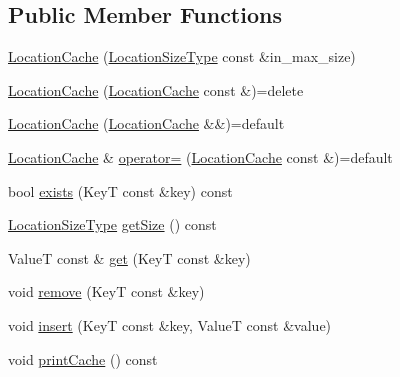 \subsection*{Public Member Functions}
\begin{DoxyCompactItemize}
\item 
\hyperlink{structvt_1_1location_1_1_location_cache_a5a43f6d320c5b23dbb819e9bc74deeeb}{Location\+Cache} (\hyperlink{namespacevt_1_1location_ab1c4c5849012a23eee2fbd1fce6159d7}{Location\+Size\+Type} const \&in\+\_\+max\+\_\+size)
\item 
\hyperlink{structvt_1_1location_1_1_location_cache_a577179b586e3aa1a3d2b3c5dd6a10229}{Location\+Cache} (\hyperlink{structvt_1_1location_1_1_location_cache}{Location\+Cache} const \&)=delete
\item 
\hyperlink{structvt_1_1location_1_1_location_cache_ab6e98f027816ca0bc92d442b63160900}{Location\+Cache} (\hyperlink{structvt_1_1location_1_1_location_cache}{Location\+Cache} \&\&)=default
\item 
\hyperlink{structvt_1_1location_1_1_location_cache}{Location\+Cache} \& \hyperlink{structvt_1_1location_1_1_location_cache_a31d50fe03fe4686019333d1166d52769}{operator=} (\hyperlink{structvt_1_1location_1_1_location_cache}{Location\+Cache} const \&)=default
\item 
bool \hyperlink{structvt_1_1location_1_1_location_cache_a2e2f1c3ef1611782da77635c4181eae4}{exists} (KeyT const \&key) const
\item 
\hyperlink{namespacevt_1_1location_ab1c4c5849012a23eee2fbd1fce6159d7}{Location\+Size\+Type} \hyperlink{structvt_1_1location_1_1_location_cache_ae33d5f17b36da8b414041af55fbfac2a}{get\+Size} () const
\item 
ValueT const  \& \hyperlink{structvt_1_1location_1_1_location_cache_afb4dcce28f172b1e16567025453f22d9}{get} (KeyT const \&key)
\item 
void \hyperlink{structvt_1_1location_1_1_location_cache_ac39441e200c3c3023bda193f7075f372}{remove} (KeyT const \&key)
\item 
void \hyperlink{structvt_1_1location_1_1_location_cache_a62020ee4735da790dd652f1cfcf2583d}{insert} (KeyT const \&key, ValueT const \&value)
\item 
void \hyperlink{structvt_1_1location_1_1_location_cache_a0c8f06fd5c1ff26c30c0c25b5800ba30}{print\+Cache} () const
\end{DoxyCompactItemize}
